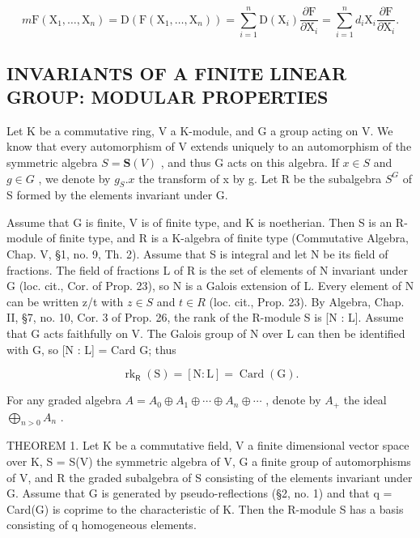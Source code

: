 \[
m \mathrm{F} (\mathrm{X} _ {1}, \dots , \mathrm{X} _ {n}) = \mathrm{D} (\mathrm{F} (\mathrm{X} _ {1}, \dots , \mathrm{X} _ {n})) = \sum_ {i = 1} ^ {n} \mathrm{D} (\mathrm{X} _ {i}) \frac {\partial \mathrm{F}}{\partial \mathrm{X} _ {i}} = \sum_ {i = 1} ^ {n} d _ {i} \mathrm{X} _ {i} \frac {\partial \mathrm{F}}{\partial \mathrm{X} _ {i}}.
\]

\subsection{INVARIANTS OF A FINITE LINEAR GROUP: MODULAR PROPERTIES}

Let K be a commutative ring, V a K-module, and G a group acting on V. We know that every automorphism of V extends uniquely to an automorphism of the symmetric algebra \(S = \mathbf{S}(V)\) , and thus G acts on this algebra. If \(x \in S\) and \(g \in G\) , we denote by \(g_{S}.x\) the transform of x by g. Let R be the subalgebra \(S^{G}\) of S formed by the elements invariant under G.

Assume that G is finite, V is of finite type, and K is noetherian. Then S is an R-module of finite type, and R is a K-algebra of finite type (Commutative Algebra, Chap. V, §1, no. 9, Th. 2). Assume that S is integral and let N be its field of fractions. The field of fractions L of R is the set of elements of N invariant under G (loc. cit., Cor. of Prop. 23), so N is a Galois extension of L. Every element of N can be written z/t with \(z \in S\) and \(t \in R\) (loc. cit., Prop. 23). By Algebra, Chap. II, §7, no. 10, Cor. 3 of Prop. 26, the rank of the R-module S is {[}N : L{]}. Assume that G acts faithfully on V. The Galois group of N over L can then be identified with G, so {[}N : L{]} = Card G; thus

\[
\operatorname{rk} _ {\mathsf {R}} (\mathrm{S}) = [ \mathrm{N}: \mathrm{L} ] = \operatorname{Card} (\mathrm{G}).\tag{6}
\]

For any graded algebra \(A = A_{0} \oplus A_{1} \oplus \cdots \oplus A_{n} \oplus \cdots\) , denote by \(A_{+}\) the ideal \(\bigoplus_{n > 0} A_{n}\) .

THEOREM 1. Let K be a commutative field, V a finite dimensional vector space over K, S = S(V) the symmetric algebra of V, G a finite group of automorphisms of V, and R the graded subalgebra of S consisting of the elements invariant under G. Assume that G is generated by pseudo-reflections (§2, no. 1) and that q = Card(G) is coprime to the characteristic of K. Then the R-module S has a basis consisting of q homogeneous elements.

